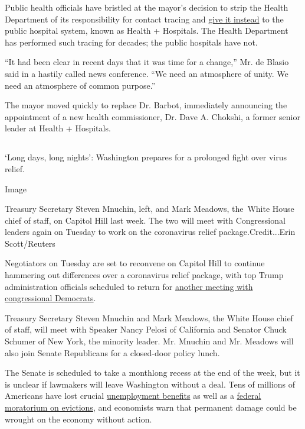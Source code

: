 Public health officials have bristled at the mayor's decision to strip
the Health Department of its responsibility for contact tracing and
\href{https://www.nytimes3xbfgragh.onion/2020/05/07/nyregion/coronavirus-contact-tracing-nyc.html}{give
it instead} to the public hospital system, known as Health + Hospitals.
The Health Department has performed such tracing for decades; the public
hospitals have not.

``It had been clear in recent days that it was time for a change,'' Mr.
de Blasio said in a hastily called news conference. ``We need an
atmosphere of unity. We need an atmosphere of common purpose.''

The mayor moved quickly to replace Dr. Barbot, immediately announcing
the appointment of a new health commissioner, Dr. Dave A. Chokshi, a
former senior leader at Health + Hospitals.

\hypertarget{-2}{%
\subsection{}\label{-2}}

`Long days, long nights': Washington prepares for a prolonged fight over
virus relief.

Image

Treasury Secretary Steven Mnuchin, left, and Mark Meadows, the~White
House chief of staff, on Capitol Hill last week. The two will meet with
Congressional leaders again on Tuesday to work on the coronavirus relief
package.Credit...Erin Scott/Reuters

Negotiators on Tuesday are set to reconvene on Capitol Hill to continue
hammering out differences over a coronavirus relief package, with top
Trump administration officials scheduled to return for
\href{https://www.nytimes3xbfgragh.onion/2020/08/02/us/politics/coronavirus-jobless-aid.html}{another
meeting with congressional Democrats}.

Treasury Secretary Steven Mnuchin and Mark Meadows, the White House
chief of staff, will meet with Speaker Nancy Pelosi of California and
Senator Chuck Schumer of New York, the minority leader. Mr. Mnuchin and
Mr. Meadows will also join Senate Republicans for a closed-door policy
lunch.

The Senate is scheduled to take a monthlong recess at the end of the
week, but it is unclear if lawmakers will leave Washington without a
deal. Tens of millions of Americans have lost crucial
\href{https://www.nytimes3xbfgragh.onion/2020/07/30/business/unemployment-payments-change.html}{unemployment
benefits} as well as a
\href{https://www.nytimes3xbfgragh.onion/2020/07/23/business/evictions-moratorium-cares-act.html}{federal
moratorium on evictions}, and economists warn that permanent damage
could be wrought on the economy without action.


